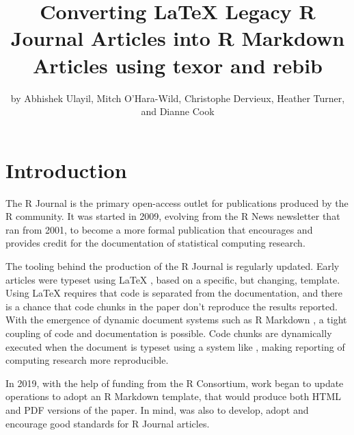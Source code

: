 \title{Converting LaTeX Legacy R Journal Articles into R Markdown Articles using texor and rebib}


\author{by Abhishek Ulayil, Mitch O'Hara-Wild, Christophe Dervieux, Heather Turner, and Dianne Cook}

\maketitle


\section{Introduction}\label{introduction}

The R Journal is the primary open-access outlet for publications produced by the R community. It was started in 2009, evolving from the R News newsletter that ran from 2001, to become a more formal publication that encourages and provides credit for the documentation of statistical computing research.

The tooling behind the production of the R Journal is regularly updated. Early articles were typeset using LaTeX \citep{latex}, based on a specific, but changing, template. Using LaTeX requires that code is separated from the documentation, and there is a chance that code chunks in the paper don't reproduce the results reported. With the emergence of dynamic document systems such as R Markdown \citep{rmarkdown}, a tight coupling of code and documentation is possible. Code chunks are dynamically executed when the document is typeset using a system like  \citep{knitr}, making reporting of computing research more reproducible.

In 2019, with the help of funding from the R Consortium, work began to update operations to adopt an R Markdown template, that would produce both HTML and PDF versions of the paper. In mind, was also to develop, adopt and encourage good standards for R Journal articles.

